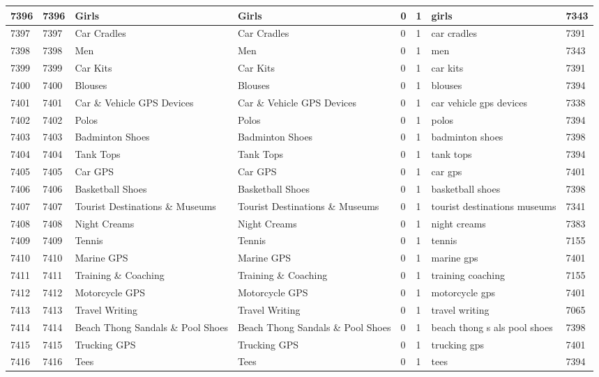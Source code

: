 \begin{longtable}{|l|l|l|l|l|l|l|l|}
7396 & 7396 & Girls & Girls & 0 & 1 & girls & 7343 \\ \hline 
7397 & 7397 & Car Cradles & Car Cradles & 0 & 1 & car cradles & 7391 \\ \hline 
7398 & 7398 & Men & Men & 0 & 1 & men & 7343 \\ \hline 
7399 & 7399 & Car Kits & Car Kits & 0 & 1 & car kits & 7391 \\ \hline 
7400 & 7400 & Blouses & Blouses & 0 & 1 & blouses & 7394 \\ \hline 
7401 & 7401 & Car \& Vehicle GPS Devices & Car \& Vehicle GPS Devices & 0 & 1 & car vehicle gps devices & 7338 \\ \hline 
7402 & 7402 & Polos & Polos & 0 & 1 & polos & 7394 \\ \hline 
7403 & 7403 & Badminton Shoes & Badminton Shoes & 0 & 1 & badminton shoes & 7398 \\ \hline 
7404 & 7404 & Tank Tops & Tank Tops & 0 & 1 & tank tops & 7394 \\ \hline 
7405 & 7405 & Car GPS & Car GPS & 0 & 1 & car gps & 7401 \\ \hline 
7406 & 7406 & Basketball Shoes & Basketball Shoes & 0 & 1 & basketball shoes & 7398 \\ \hline 
7407 & 7407 & Tourist Destinations \& Museums & Tourist Destinations \& Museums & 0 & 1 & tourist destinations museums & 7341 \\ \hline 
7408 & 7408 & Night Creams & Night Creams & 0 & 1 & night creams & 7383 \\ \hline 
7409 & 7409 & Tennis & Tennis & 0 & 1 & tennis & 7155 \\ \hline 
7410 & 7410 & Marine GPS & Marine GPS & 0 & 1 & marine gps & 7401 \\ \hline 
7411 & 7411 & Training \& Coaching & Training \& Coaching & 0 & 1 & training coaching & 7155 \\ \hline 
7412 & 7412 & Motorcycle GPS & Motorcycle GPS & 0 & 1 & motorcycle gps & 7401 \\ \hline 
7413 & 7413 & Travel Writing & Travel Writing & 0 & 1 & travel writing & 7065 \\ \hline 
7414 & 7414 & Beach Thong Sandals \& Pool Shoes & Beach Thong Sandals \& Pool Shoes & 0 & 1 & beach thong s als pool shoes & 7398 \\ \hline 
7415 & 7415 & Trucking GPS & Trucking GPS & 0 & 1 & trucking gps & 7401 \\ \hline 
7416 & 7416 & Tees & Tees & 0 & 1 & tees & 7394 \\ \hline 

\end{longtable}

